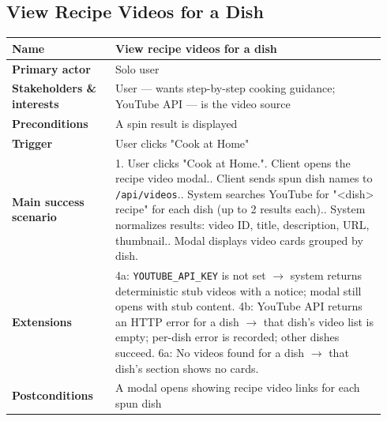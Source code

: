 \documentclass[sigconf]{acmart}
\begin{document}
\subsection*{View Recipe Videos for a Dish}
{\footnotesize
\begin{supertabular}{@{}p{0.26\linewidth}p{0.68\linewidth}@{}}
\textbf{Name} & View recipe videos for a dish \\
\hline
\textbf{Primary actor} & Solo user \\
\hline
\textbf{Stakeholders \& interests} & User --- wants step-by-step cooking guidance; YouTube API --- is the video source \\
\hline
\textbf{Preconditions} & A spin result is displayed \\
\hline
\textbf{Trigger} & User clicks "Cook at Home" \\
\hline
\textbf{Main success scenario} & 1. User clicks "Cook at Home.". Client opens the recipe video modal.. Client sends spun dish names to \texttt{/api/videos}.. System searches YouTube for "<dish> recipe" for each dish (up to 2 results each).. System normalizes results: video ID, title, description, URL, thumbnail.. Modal displays video cards grouped by dish. \\
\hline
\textbf{Extensions} & 4a: \texttt{YOUTUBE\_API\_KEY} is not set $\rightarrow$ system returns deterministic stub videos with a notice; modal still opens with stub content.\newline
4b: YouTube API returns an HTTP error for a dish $\rightarrow$ that dish's video list is empty; per-dish error is recorded; other dishes succeed.\newline
6a: No videos found for a dish $\rightarrow$ that dish's section shows no cards. \\
\hline
\textbf{Postconditions} & A modal opens showing recipe video links for each spun dish \\
\end{supertabular}
}
\end{document}
